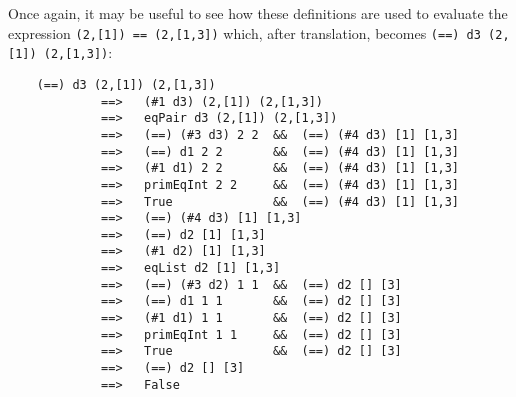 \EQ
%
Once again, it may be useful to see how these definitions are  used  to
evaluate  the  expression   \verb"(2,[1]) == (2,[1,3])"   which,   after
translation, becomes \verb"(==) d3 (2,[1]) (2,[1,3])":
\begin{verbatim}
    (==) d3 (2,[1]) (2,[1,3])
             ==>   (#1 d3) (2,[1]) (2,[1,3])
             ==>   eqPair d3 (2,[1]) (2,[1,3])
             ==>   (==) (#3 d3) 2 2  &&  (==) (#4 d3) [1] [1,3]
             ==>   (==) d1 2 2       &&  (==) (#4 d3) [1] [1,3]
             ==>   (#1 d1) 2 2       &&  (==) (#4 d3) [1] [1,3]
             ==>   primEqInt 2 2     &&  (==) (#4 d3) [1] [1,3]
             ==>   True              &&  (==) (#4 d3) [1] [1,3]
             ==>   (==) (#4 d3) [1] [1,3]
             ==>   (==) d2 [1] [1,3]
             ==>   (#1 d2) [1] [1,3]
             ==>   eqList d2 [1] [1,3]
             ==>   (==) (#3 d2) 1 1  &&  (==) d2 [] [3]
             ==>   (==) d1 1 1       &&  (==) d2 [] [3]
             ==>   (#1 d1) 1 1       &&  (==) d2 [] [3]
             ==>   primEqInt 1 1     &&  (==) d2 [] [3]
             ==>   True              &&  (==) d2 [] [3]
             ==>   (==) d2 [] [3]
             ==>   False
\end{verbatim}

